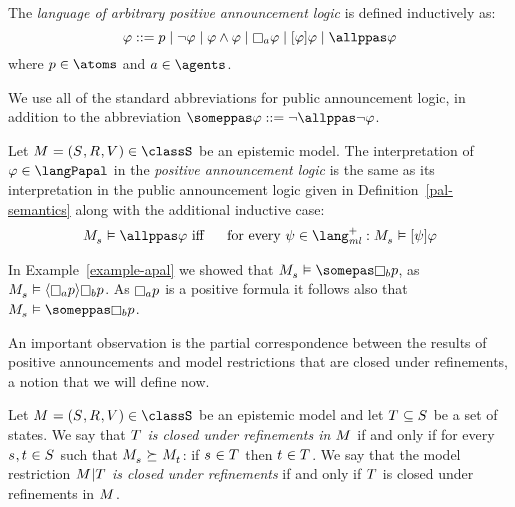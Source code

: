 \begin{definition}\label{papal-syntax}
The {\em language of arbitrary positive announcement logic \langPapal{}} is defined inductively as:
$$
    \phi ::=
        \atomP \mid
        \neg \phi \mid
        \phi \land \phi \mid
        \necessary[\agentA] \phi \mid
        \announceA{\phi} \phi \mid
        \allppas \phi
$$
where $\atomP \in \atoms$ and $\agentA \in \agents$.
\end{definition}

We use all of the standard abbreviations for public announcement logic, in addition to the abbreviation $\someppas \phi ::= \neg \allppas \neg \phi$.

\begin{definition}\label{papal-semantics}
Let $\kModelAndTuple \in \classS$ be an epistemic model.
The interpretation of $\phi \in \langPapal$ in the {\em positive announcement logic \logicPapalS{}} is the same as its interpretation in the public announcement logic \logicPalS{} given in Definition~\ref{pal-semantics} along with the additional inductive case:
\begin{eqnarray*}
    \kPModel{\kStateS} \entails \allppas \phi &\text{ iff }& \text{ for every } \psi \in \langMlPlus : \kPModel{\kStateS} \entails \announceA{\psi} \phi
\end{eqnarray*}
\end{definition}

\begin{example}\label{example-papal}
In Example~\ref{example-apal} we showed that $\kPModel{\kStateS} \entails \somepas \knows[\agentB] \atomP$, as $\kPModel{\kStateS} \entails \announceE{\knows[\agentA] \atomP} \knows[\agentB] \atomP$.
As $\knows[\agentA] \atomP$ is a positive formula it follows also that $\kPModel{\kStateS} \entails \someppas \knows[\agentB] \atomP$.
\end{example}

An important observation is the partial correspondence between the results of positive announcements and model restrictions that are closed under refinements, a notion that we will define now.

\begin{definition}\label{closed-under-refinements}
Let $\kModelAndTuple \in \classS$ be an epistemic model and 
let $\kStatesT \subseteq \kStates$ be a set of states.
We say that {\em $\kStatesT$ is closed under refinements in $\kModel$} if and only if for every $\kStateS, \kStateT \in \kStates$ such that $\kPModel{\kStateS} \simulates \kPModel{\kStateT}$: if $\kStateS \in \kStatesT$ then $\kStateT \in \kStatesT$.
We say that the model restriction {\em $\restrict{\kModel}{\kStatesT}$ is closed under refinements} if and only if $\kStatesT$ is closed under refinements in $\kModel$.
\end{definition}

